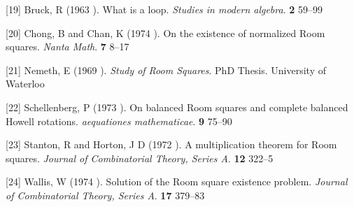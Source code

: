 \documentclass[
  12pt,
  a4paper]{book}
\begin{document}
\leavevmode\hypertarget{ref-bruck_what_1963}{}%
{[}19{]} Bruck, R (1963 ). What is a loop. \emph{Studies in modern algebra}. \textbf{2} 59--99

\leavevmode\hypertarget{ref-chong_existence_1974}{}%
{[}20{]} Chong, B and Chan, K (1974 ). On the existence of normalized Room squares. \emph{Nanta Math}. \textbf{7} 8--17

\leavevmode\hypertarget{ref-nemeth_study_1969}{}%
{[}21{]} Nemeth, E (1969 ). \emph{Study of Room Squares}. PhD Thesis. University of Waterloo

\leavevmode\hypertarget{ref-schellenberg_balanced_1973}{}%
{[}22{]} Schellenberg, P (1973 ). On balanced Room squares and complete balanced Howell rotations. \emph{aequationes mathematicae}. \textbf{9} 75--90

\leavevmode\hypertarget{ref-stanton_multiplication_1972}{}%
{[}23{]} Stanton, R and Horton, J D (1972 ). A multiplication theorem for Room squares. \emph{Journal of Combinatorial Theory, Series A}. \textbf{12} 322--5

\leavevmode\hypertarget{ref-wallis_solution_1974}{}%
{[}24{]} Wallis, W (1974 ). Solution of the Room square existence problem. \emph{Journal of Combinatorial Theory, Series A}. \textbf{17} 379--83
\end{document}
